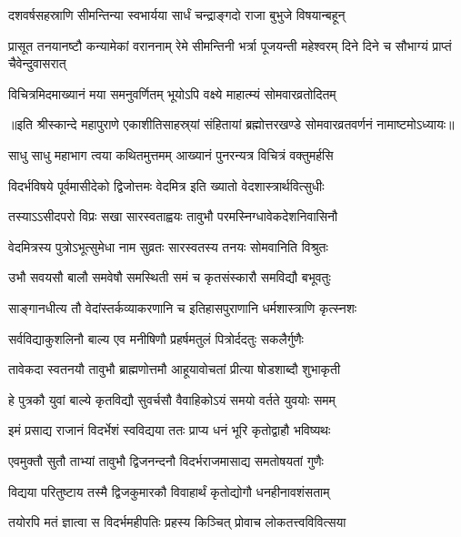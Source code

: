 \begin{center}
\twolineshloka
{दशवर्षसहस्राणि सीमन्तिन्या स्वभार्यया}
{सार्धं चन्द्राङ्गदो राजा बुभुजे विषयान्बहून्} %

\threelineshloka
{प्रासूत तनयानष्टौ कन्यामेकां वराननाम्}
{रेमे सीमन्तिनी भर्त्रा पूजयन्ती महेश्वरम्}
{दिने दिने च सौभाग्यं प्राप्तं चैवेन्दुवासरात्} %

\twolineshloka
{विचित्रमिदमाख्यानं मया समनुवर्णितम्}
{भूयोऽपि वक्ष्ये माहात्म्यं सोमवारव्रतोदितम्} %

{॥इति श्रीस्कान्दे महापुराणे एकाशीतिसाहस्र्यां संहितायां ब्रह्मोत्तरखण्डे सोमवारव्रतवर्णनं नामाष्टमोऽध्यायः॥}



\resetShloka

\twolineshloka
{साधु साधु महाभाग त्वया कथितमुत्तमम्}
{आख्यानं पुनरन्यत्र विचित्रं वक्तुमर्हसि} %

\twolineshloka
{विदर्भविषये पूर्वमासीदेको द्विजोत्तमः}
{वेदमित्र इति ख्यातो वेदशास्त्रार्थवित्सुधीः} %

\twolineshloka
{तस्याऽऽसीदपरो विप्रः सखा सारस्वताह्वयः}
{तावुभौ परमस्निग्धावेकदेशनिवासिनौ} %

\twolineshloka
{वेदमित्रस्य पुत्रोऽभूत्सुमेधा नाम सुव्रतः}
{सारस्वतस्य तनयः सोमवानिति विश्रुतः} %

\twolineshloka
{उभौ सवयसौ बालौ समवेषौ समस्थिती}
{समं च कृतसंस्कारौ समविद्यौ बभूवतुः} %

\twolineshloka
{साङ्गानधीत्य तौ वेदांस्तर्कव्याकरणानि च}
{इतिहासपुराणानि धर्मशास्त्राणि कृत्स्नशः} %

\twolineshloka
{सर्वविद्याकुशलिनौ बाल्य एव मनीषिणौ}
{प्रहर्षमतुलं पित्रोर्ददतुः सकलैर्गुणैः} %

\twolineshloka
{तावेकदा स्वतनयौ तावुभौ ब्राह्मणोत्तमौ}
{आहूयावोचतां प्रीत्या षोडशाब्दौ शुभाकृती} %

\twolineshloka
{हे पुत्रकौ युवां बाल्ये कृतविद्यौ सुवर्चसौ}
{वैवाहिकोऽयं समयो वर्तते युवयोः समम्} %

\twolineshloka
{इमं प्रसाद्य राजानं विदर्भेशं स्वविद्यया}
{ततः प्राप्य धनं भूरि कृतोद्वाहौ भविष्यथः} %

\twolineshloka
{एवमुक्तौ सुतौ ताभ्यां तावुभौ द्विजनन्दनौ}
{विदर्भराजमासाद्य समतोषयतां गुणैः} %

\twolineshloka
{विद्यया परितुष्टाय तस्मै द्विजकुमारकौ}
{विवाहार्थं कृतोद्योगौ धनहीनावशंसताम्} %

\twolineshloka
{तयोरपि मतं ज्ञात्वा स विदर्भमहीपतिः}
{प्रहस्य किञ्चित् प्रोवाच लोकतत्त्वविवित्सया} %


\end{center}
